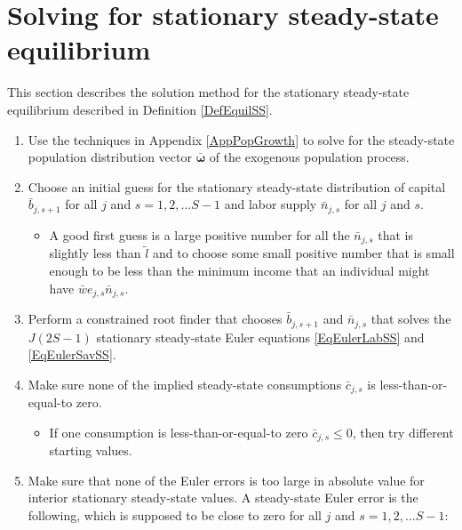 \documentclass[letterpaper,12pt]{article}
\theoremstyle{definition}
\renewcommand\theenumi{\roman{enumi}}
\begin{document}
\newpage
\section{Solving for stationary steady-state equilibrium}\label{AppSSsolve}

  \setcounter{equation}{0}
  \renewcommand\theenumi{\arabic{enumi}}
  \renewcommand\theenumii{\alph{enumii}}
  \renewcommand\theenumiii{\roman{enumiii}}

  This section describes the solution method for the stationary steady-state equilibrium described in Definition \ref{DefEquilSS}.

  \begin{enumerate}
    \item Use the techniques in Appendix \ref{AppPopGrowth} to solve for the steady-state population distribution vector $\bm{\bar{\omega}}$ of the exogenous population process.
    \item Choose an initial guess for the stationary steady-state distribution of capital $\bar{b}_{j,s+1}$ for all $j$ and $s=1,2,...S-1$ and labor supply $\bar{n}_{j,s}$ for all $j$ and $s$.
      \begin{itemize}
        \item A good first guess is a large positive number for all the $\bar{n}_{j,s}$ that is slightly less than $\tilde{l}$ and to choose some small positive number that is small enough to be less than the minimum income that an individual might have $\bar{w}e_{j,s}\bar{n}_{j,s}$.
      \end{itemize}
    \item Perform a constrained root finder that chooses $\bar{b}_{j,s+1}$ and $\bar{n}_{j,s}$ that solves the $J(2S-1)$ stationary steady-state Euler equations \eqref{EqEulerLabSS} and \eqref{EqEulerSavSS}.
    \item Make sure none of the implied steady-state consumptions $\bar{c}_{j,s}$ is less-than-or-equal-to zero.
      \begin{itemize}
        \item If one consumption is less-than-or-equal-to zero $\bar{c}_{j,s}\leq 0$, then try different starting values.
      \end{itemize}
    \item Make sure that none of the Euler errors is too large in absolute value for interior stationary steady-state values. A steady-state Euler error is the following, which is supposed to be close to zero for all $j$ and $s=1,2,...S-1$:
      \begin{equation}\label{EqSSeulerr}

\end{equation}
\end{enumerate}
\end{document}
